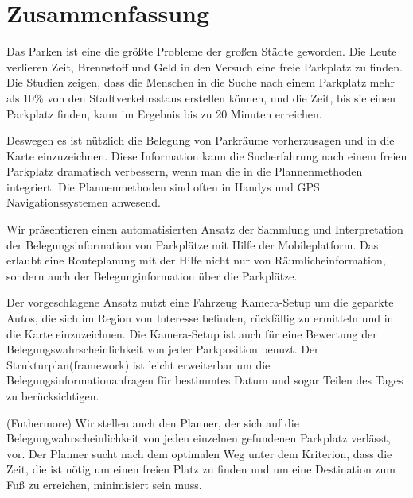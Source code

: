 \chapter*{Zusammenfassung}
\label{cha:zusammenfassung}

Das Parken ist eine die größte Probleme der großen Städte geworden. Die Leute
verlieren Zeit, Brennstoff und Geld in den Versuch eine freie Parkplatz zu
finden. Die Studien zeigen, dass die Menschen in die Suche nach einem
Parkplatz mehr als 10\% von den Stadtverkehrsstaus erstellen können, und die
Zeit, bis sie einen Parkplatz finden, kann im Ergebnis bis zu 20 Minuten
erreichen.

Deswegen es ist nützlich die Belegung von Parkräume vorherzusagen und in die
Karte einzuzeichnen. Diese Information kann die Sucherfahrung nach einem
freien Parkplatz dramatisch verbessern, wenn man die in die Plannenmethoden
integriert. Die Plannenmethoden sind often in Handys und GPS
Navigationssystemen anwesend.

Wir präsentieren einen automatisierten Ansatz der Sammlung und Interpretation
der Belegungsinformation von Parkplätze mit Hilfe der Mobileplatform. Das
erlaubt eine Routeplanung mit der Hilfe nicht nur von Räumlicheinformation,
sondern auch der Belegunginformation über die Parkplätze.

Der vorgeschlagene Ansatz nutzt eine Fahrzeug Kamera-Setup um die geparkte
Autos, die sich im Region von Interesse befinden, rückfällig zu ermitteln und
in die Karte einzuzeichnen. Die Kamera-Setup ist auch für eine Bewertung der
Belegungswahrscheinlichkeit von jeder Parkposition benuzt. Der
Strukturplan(framework) ist leicht erweiterbar um die
Belegungsinformationanfragen für bestimmtes Datum und sogar Teilen des Tages
zu berücksichtigen.

(Futhermore) Wir stellen auch den Planner, der sich auf die
Belegungwahrscheinlichkeit von jeden einzelnen gefundenen Parkplatz verlässt,
vor. Der Planner sucht nach dem optimalen Weg unter dem Kriterion, dass die
Zeit, die ist nötig um einen freien Platz zu finden und um eine Destination
zum Fuß zu erreichen, minimisiert sein muss.
